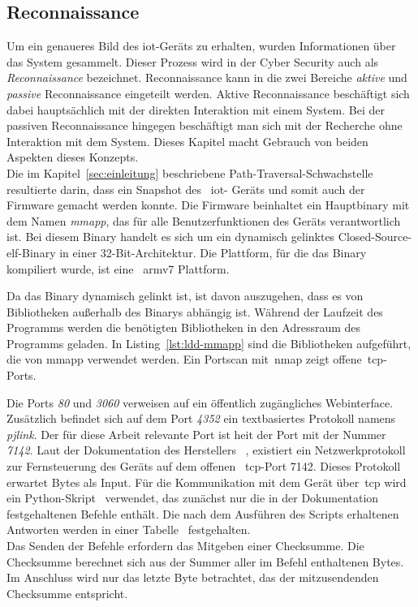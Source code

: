 
\subsection{Reconnaissance}\label{subsec:reconnaissance}
Um ein genaueres Bild des \gls{iot}-Geräts zu erhalten, wurden Informationen über das System gesammelt.
Dieser Prozess wird in der Cyber Security auch als \textit{Reconnaissance} bezeichnet.
Reconnaissance kann in die zwei Bereiche \textit{aktive} und \textit{passive} Reconnaissance eingeteilt werden.
Aktive Reconnaissance beschäftigt sich dabei hauptsächlich mit der direkten Interaktion mit einem System.
Bei der passiven Reconnaissance hingegen beschäftigt man sich mit der Recherche ohne Interaktion mit dem System.
Dieses Kapitel macht Gebrauch von beiden Aspekten dieses Konzepts.\\
\linebreak
Die im Kapitel~\ref{sec:einleitung} beschriebene Path-Traversal-Schwachstelle resultierte darin, dass ein Snapshot des ~\gls{iot}-
Geräts und somit auch der Firmware gemacht werden konnte.
Die Firmware beinhaltet ein Hauptbinary mit dem Namen \textit{mmapp}, das für alle Benutzerfunktionen des Geräts
verantwortlich ist.
Bei diesem Binary handelt es sich um ein dynamisch gelinktes Closed-Source-\gls{elf}-Binary in einer 32-Bit-Architektur.
Die Plattform, für die das Binary kompiliert wurde, ist eine ~\gls{arm}v7 Plattform.

Da das Binary dynamisch gelinkt ist, ist davon auszugehen, dass es von Bibliotheken außerhalb des Binarys abhängig ist.
Während der Laufzeit des Programms werden die benötigten Bibliotheken in den Adressraum des Programms geladen.
In Listing~\ref{lst:ldd-mmapp} sind die Bibliotheken aufgeführt, die von mmapp verwendet werden.
Ein Portscan mit~\gls{nmap} zeigt offene~\gls{tcp}-Ports.
\pagebreak

Die Ports \textit{80} und \textit{3060} verweisen auf ein öffentlich zugängliches Webinterface.
Zusätzlich befindet sich auf dem Port \textit{4352} ein textbasiertes Protokoll namens \textit{pjlink}.
Der für diese Arbeit relevante Port ist heit der Port mit der Nummer \textit{7142}.
Laut der Dokumentation des Herstellers ~\cite{binary-prot-doc}, existiert ein
Netzwerkprotokoll zur Fernsteuerung des Geräts auf dem offenen ~\gls{tcp}-Port 7142.
Dieses Protokoll erwartet Bytes als Input.
Für die Kommunikation mit dem Gerät über~\gls{tcp} wird ein Python-Skript~\cite{binaryProt-py} verwendet, das zunächst nur die in der Dokumentation festgehaltenen Befehle enthält.
Die nach dem Ausführen des Scripts erhaltenen Antworten werden in einer Tabelle~\cite{reqs-n-res} festgehalten. \\
Das Senden der Befehle erfordern das Mitgeben einer Checksumme.
Die Checksumme berechnet sich aus der Summer aller im Befehl enthaltenen Bytes.
Im Anschluss wird nur das letzte Byte betrachtet, das der mitzusendenden Checksumme entspricht.
